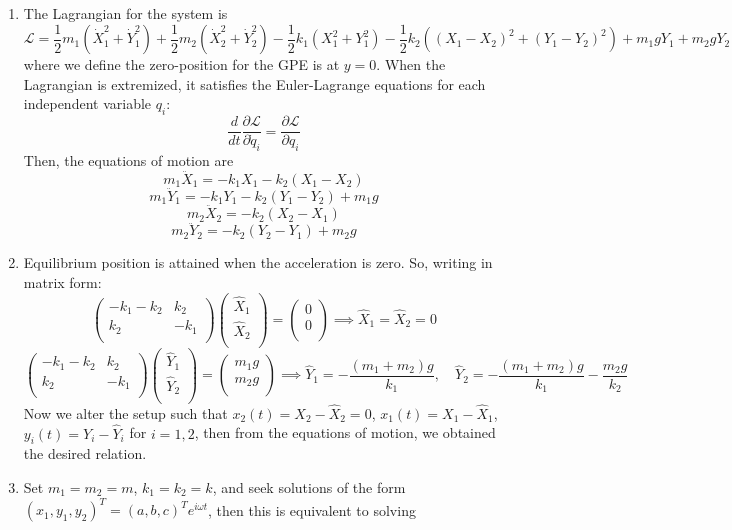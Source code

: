 \documentclass[a4paper]{article}
\begin{document}
\begin{ans}\leavevmode
\begin{enumerate}[label=(\alph*)]
\item The Lagrangian for the system is
$$\mathcal{L}=\frac{1}{2}m_1(\dot{X}_1^2+\dot{Y}_1^2)+\frac{1}{2}m_2(\dot{X}_2^2+\dot{Y}_2^2)-\frac{1}{2}k_1(X_1^2+Y_1^2)-\frac{1}{2}k_2((X_1-X_2)^2+(Y_1-Y_2)^2)+m_1gY_1+m_2gY_2$$
where we define the zero-position for the GPE is at $y=0$. When the Lagrangian is extremized, it satisfies the Euler-Lagrange equations for each independent variable $q_i$:
$$\frac{d}{dt}\frac{\partial\mathcal{L}}{\partial\dot{q}_i}=\frac{\partial\mathcal{L}}{\partial q_i}$$
Then, the equations of motion are
$$m_1\ddot{X}_1=-k_1X_1-k_2(X_1-X_2)$$
$$m_1\ddot{Y}_1=-k_1Y_1-k_2(Y_1-Y_2)+m_1g$$
$$m_2\ddot{X}_2=-k_2(X_2-X_1)$$
$$m_2\ddot{Y}_2=-k_2(Y_2-Y_1)+m_2g$$
\item Equilibrium position is attained when the acceleration is zero. So, writing in matrix form:
$$\begin{pmatrix}-k_1-k_2&k_2\\k_2&-k_1\\\end{pmatrix}\begin{pmatrix}\hat{X}_1\\\hat{X}_2\\\end{pmatrix}=\begin{pmatrix}0\\0\\\end{pmatrix}\implies\hat{X}_1=\hat{X}_2=0$$
$$\begin{pmatrix}-k_1-k_2&k_2\\k_2&-k_1\\\end{pmatrix}\begin{pmatrix}\hat{Y}_1\\\hat{Y}_2\\\end{pmatrix}=\begin{pmatrix}m_1g\\m_2g\\\end{pmatrix}\implies\hat{Y}_1=-\frac{(m_1+m_2)g}{k_1},\quad \hat{Y}_2=-\frac{(m_1+m_2)g}{k_1}-\frac{m_2g}{k_2}$$
Now we alter the setup such that $x_2(t)=X_2-\hat{X}_2=0$, $x_1(t)=X_1-\hat{X}_1$, $y_i(t)=Y_i-\hat{Y}_i$ for $i=1,2$, then from the equations of motion, we obtained the desired relation.
\item Set $m_1=m_2=m$, $k_1=k_2=k$, and seek solutions of the form $(x_1,y_1,y_2)^T=(a,b,c)^Te^{i\omega t}$, then this is equivalent to solving

\end{enumerate}
\end{ans}
\end{document}
